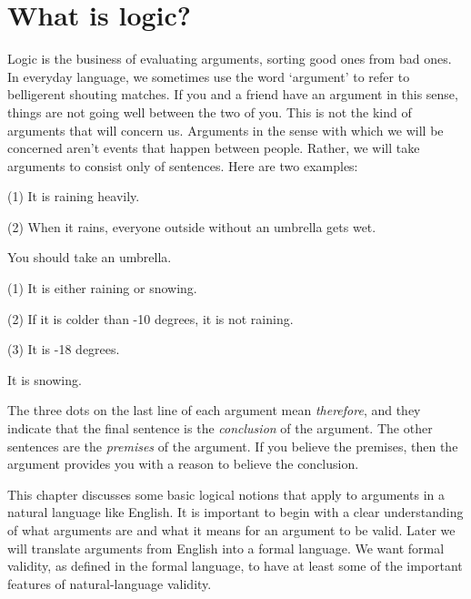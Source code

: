 \chapter{What is logic?}
\label{ch.intro}

Logic is the business of evaluating arguments, sorting good ones from bad ones.
In everyday language, we sometimes use the word `argument' to refer to belligerent shouting matches.
If you and a friend have an argument in this sense, things are not going well between the two of you.
This is not the kind of arguments that will concern us.
Arguments in the sense with which we will be concerned aren't events that happen between people.
Rather, we will take arguments to consist only of sentences. %
Here are two examples:

\label{argRaining}
\begin{earg}
  \item[(1)] It is raining heavily.
  \item[(2)] When it rains, everyone outside without an umbrella gets wet.
  \item[\therefore] You should take an umbrella.
\end{earg}


\label{argSnowing}
\begin{earg}
  \item[(1)] It is either raining or snowing.
  \item[(2)] If it is colder than -10 degrees, it is not raining.
  \item[(3)] It is -18 degrees.
  \item[\therefore] It is snowing.
\end{earg}
 
The three dots on the last line of each argument mean \textit{therefore}, and they indicate that the final sentence is the \textsl{conclusion} of the argument.
The other sentences are the \textsl{premises} of the argument.
If you believe the premises, then the argument provides you with a reason to believe the conclusion.

This chapter discusses some basic logical notions that apply to arguments in a natural language like English.
It is important to begin with a clear understanding of what arguments are and what it means for an argument to be valid.
Later we will translate arguments from English into a formal language.
We want formal validity, as defined in the formal language, to have at least some of the important features of natural-language validity.




